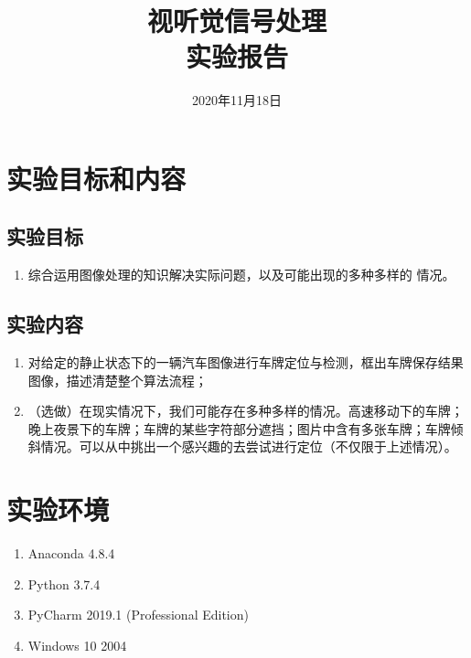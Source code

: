\documentclass{hitreport}
\title{视听觉信号处理\\实验报告}
\date{2020年11月18日}
\begin{document}
\maketitle

\tableofcontents
\newpage




\section{实验目标和内容}

\subsection{实验目标}
\begin{enumerate}
\item 综合运用图像处理的知识解决实际问题，以及可能出现的多种多样的
情况。
\end{enumerate}

\subsection{实验内容}
\begin{enumerate}
\item 对给定的静止状态下的一辆汽车图像进行车牌定位与检测，框出车牌保存结果图像，描述清楚整个算法流程；
\item （选做）在现实情况下，我们可能存在多种多样的情况。高速移动下的车牌；晚上夜景下的车牌；车牌的某些字符部分遮挡；图片中含有多张车牌；车牌倾斜情况。可以从中挑出一个感兴趣的去尝试进行定位（不仅限于上述情况）。
\end{enumerate}

\section{实验环境}

\begin{enumerate}
\item Anaconda 4.8.4
\item Python 3.7.4
\item PyCharm 2019.1 (Professional Edition)
\item Windows 10 2004
\end{enumerate}
\end{document}
